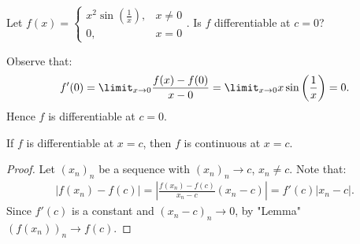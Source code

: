     \begin{example}
        Let $f(x) = \begin{cases} x^2\sin \left(\frac{1}{x}\right), & x \neq 0 \\ 0, & x = 0\end{cases}$. Is $f$ differentiable at $c = 0$?
    \end{example}
        \begin{solution}
            Observe that:
                \begin{equation*}
                \begin{split}
                    f'(0) = \limit_{x \rightarrow 0}\frac{f(x) - f(0)}{x-0} = \limit_{x \rightarrow 0} x \sin \left(\frac{1}{x}\right) = 0.
                \end{split}
                \end{equation*}
            Hence $f$ is differentiable at $c=0$.
        \end{solution}

    \begin{proposition}
        If $f$ is differentiable at $x=c$, then $f$ is continuous at $x= c$.
    \end{proposition}
        \begin{proof}
            Let $(x_n)_n$ be a sequence with $(x_n)_n \rightarrow c$, $x_n \neq c$. Note that:
                \begin{equation*}
                \begin{split}
                    |f(x_n) - f(c)| = \left|\frac{f(x_n) - f(c)}{x_n - c} ( x_n - c)\right| = f'(c)|x_n - c|.
                \end{split}
                \end{equation*}
            Since $f'(c)$ is a constant and $(x_n - c)_n \rightarrow 0$, by "Lemma" $(f(x_n))_n \rightarrow f(c)$.
        \end{proof}

